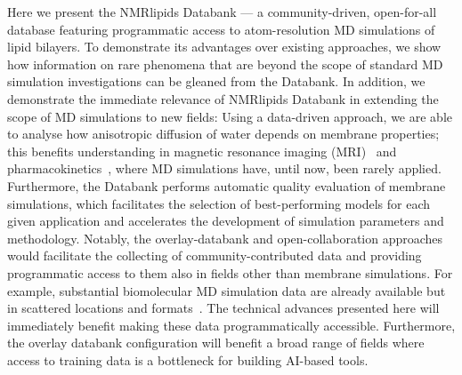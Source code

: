 \documentclass[fleqn,10pt]{wlscirep}
\begin{document}
Here we present the NMRlipids Databank --- a community-driven, open-for-all database featuring programmatic access to atom-resolution MD simulations of lipid bilayers. To demonstrate its advantages over existing approaches, we show how information on rare phenomena that are beyond the scope of standard MD simulation investigations can be gleaned from the Databank. In addition, we demonstrate the immediate relevance of NMRlipids Databank in extending the scope of MD simulations to new fields: Using a data-driven approach, we are able to analyse how anisotropic diffusion of water depends on membrane properties; this benefits understanding in magnetic resonance imaging (MRI)~\cite{topgaard20} and pharmacokinetics~\cite{nitsche19}, where MD simulations have, until now, been rarely applied.
Furthermore, the Databank performs automatic quality evaluation of membrane simulations, which facilitates the selection of best-performing models for each given application and accelerates the development of simulation parameters and methodology. Notably, the overlay-databank and open-collaboration approaches would facilitate the collecting of community-contributed data and providing programmatic access to them also in fields other than membrane simulations. For example, substantial biomolecular MD simulation data are already available but in scattered locations and formats~\cite{tiemann23}. The technical advances presented here will immediately benefit making these data programmatically accessible. Furthermore, the overlay databank configuration will benefit a broad range of fields where access to training data is a bottleneck for building AI-based tools.

\end{document}
